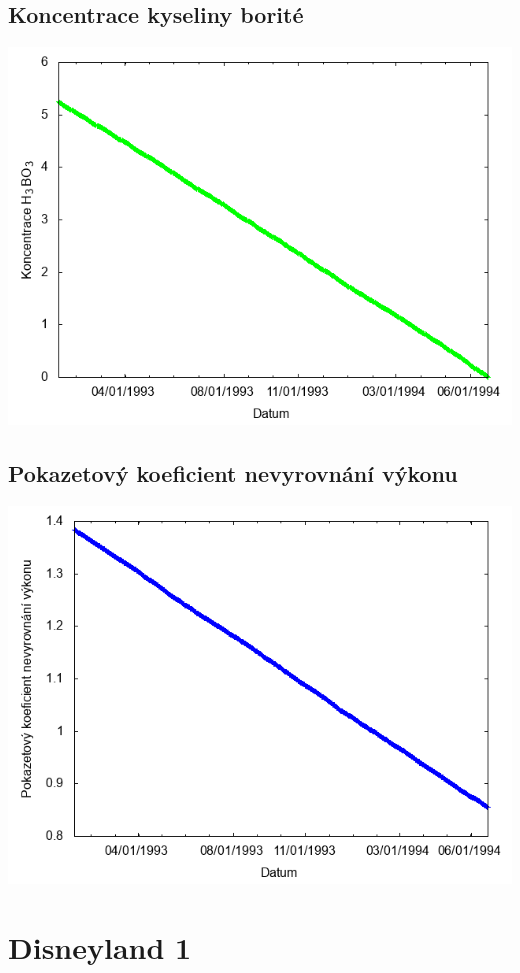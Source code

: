 \documentclass[a4paper,twoside,11pt]{article}
\begin{document}
\subsection*{Koncentrace kyseliny borité}
\begin{center}
\includegraphics[width=.8\textwidth]{graphs/CandyMountain_15_bc.png}
\end{center}

\subsection*{Pokazetový koeficient nevyrovnání výkonu}
\begin{center}
\includegraphics[width=.8\textwidth]{graphs/CandyMountain_15_fha.png}
\end{center}

\newpage
\section*{Disneyland 1}
\end{document}
